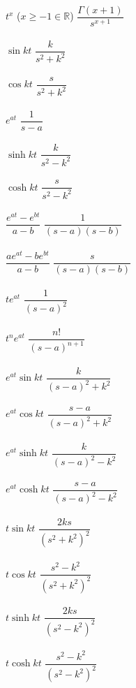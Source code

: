 \documentclass[nobib]{tufte-handout}
\begin{document}
\begin{center}
\begin{table}
\begin{tabbing}
            $t^x$ ($x\geq-1\in\mathbb{R}$)     \> $\dfrac{\Gamma(x+1)}{s^{x+1}}$ \>\LTNUM\\ \\
            $\sin kt$ 	\> $\dfrac{k}{s^2+k^2}$ \>\LTNUM \\ \\
            $\cos kt$ 	\> $\dfrac{s}{s^2+k^2}$ \>\LTNUM \\ \\
            $e^{at}$ 	\> $\dfrac{1}{s-a}$ 	\>\LTNUM \\ \\
            $\sinh kt$	\> $\dfrac{k}{s^2-k^2}$ \>\LTNUM \\ \\
            $\cosh kt$	\> $\dfrac{s}{s^2-k^2}$ \>\LTNUM \\ \\
            $\dfrac{e^{at}-e^{bt}}{a-b}$	\> $\dfrac{1}{(s-a)(s-b)}$ \>\LTNUM\\ \\ 
            $\dfrac{ae^{at}-be^{bt}}{a-b}$	\> $\dfrac{s}{(s-a)(s-b)}$ \>\LTNUM\\ \\ 
            $te^{at}$	\> $\dfrac{1}{(s-a)^2}$	\>\LTNUM \\ \\
            $t^ne^{at}$	\> $\dfrac{n!}{(s-a)^{n+1}}$	\>\LTNUM \\ \\
            $e^{at}\sin kt$	\> $\dfrac{k}{(s-a)^2+k^2}$  \>\LTNUM \\ \\
            $e^{at}\cos kt$	\> $\dfrac{s-a}{(s-a)^2+k^2}$  \>\LTNUM \\ \\
            $e^{at}\sinh kt$	\> $\dfrac{k}{(s-a)^2-k^2}$  \>\LTNUM \\ \\
            $e^{at}\cosh kt$	\> $\dfrac{s-a}{(s-a)^2-k^2}$  \>\LTNUM \\ \\
            $t\sin kt$  	\> $\dfrac{2ks}{(s^2+k^2)^2}$ \>\LTNUM \\ \\
            $t\cos kt$  	\> $\dfrac{s^2-k^2}{(s^2+k^2)^2}$ \>\LTNUM \\ \\
            $t\sinh kt$  	\> $\dfrac{2ks}{(s^2-k^2)^2}$ \>\LTNUM \\ \\
            $t\cosh kt$  	\> $\dfrac{s^2-k^2}{(s^2-k^2)^2}$ \>\LTNUM \\ \\

\end{tabbing}
\end{table}
\end{center}
\end{document}
